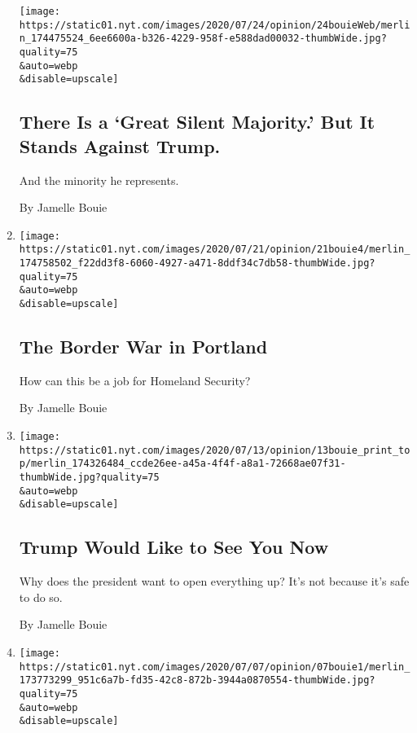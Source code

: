 \begin{enumerate}
  \texttt{[image: https://static01.nyt.com/images/2020/07/24/opinion/24bouieWeb/merlin\_174475524\_6ee6600a-b326-4229-958f-e588dad00032-thumbWide.jpg?quality=75\\\&auto=webp\\\&disable=upscale]}

  \hypertarget{there-is-a-great-silent-majority-but-it-stands-against-trump}{%
  \subsection{There Is a `Great Silent Majority.' But It Stands Against
  Trump.}\label{there-is-a-great-silent-majority-but-it-stands-against-trump}}

  And the minority he represents.

  By Jamelle Bouie
\item
  \href{/2020/07/21/opinion/portland-homeland-security.html}{}

  \texttt{[image: https://static01.nyt.com/images/2020/07/21/opinion/21bouie4/merlin\_174758502\_f22dd3f8-6060-4927-a471-8ddf34c7db58-thumbWide.jpg?quality=75\\\&auto=webp\\\&disable=upscale]}

  \hypertarget{the-border-war-in-portland}{%
  \subsection{The Border War in
  Portland}\label{the-border-war-in-portland}}

  How can this be a job for Homeland Security?

  By Jamelle Bouie
\item
  \href{/2020/07/10/opinion/trump-schools-reopening.html}{}

  \texttt{[image: https://static01.nyt.com/images/2020/07/13/opinion/13bouie\_print\_top/merlin\_174326484\_ccde26ee-a45a-4f4f-a8a1-72668ae07f31-thumbWide.jpg?quality=75\\\&auto=webp\\\&disable=upscale]}

  \hypertarget{trump-would-like-to-see-you-now}{%
  \subsection{Trump Would Like to See You
  Now}\label{trump-would-like-to-see-you-now}}

  Why does the president want to open everything up? It's not because
  it's safe to do so.

  By Jamelle Bouie
\item
  \href{/2020/07/07/opinion/trump-mount-rushmore-culture-war.html}{}

  \texttt{[image: https://static01.nyt.com/images/2020/07/07/opinion/07bouie1/merlin\_173773299\_951c6a7b-fd35-42c8-872b-3944a0870554-thumbWide.jpg?quality=75\\\&auto=webp\\\&disable=upscale]}


\end{enumerate}
